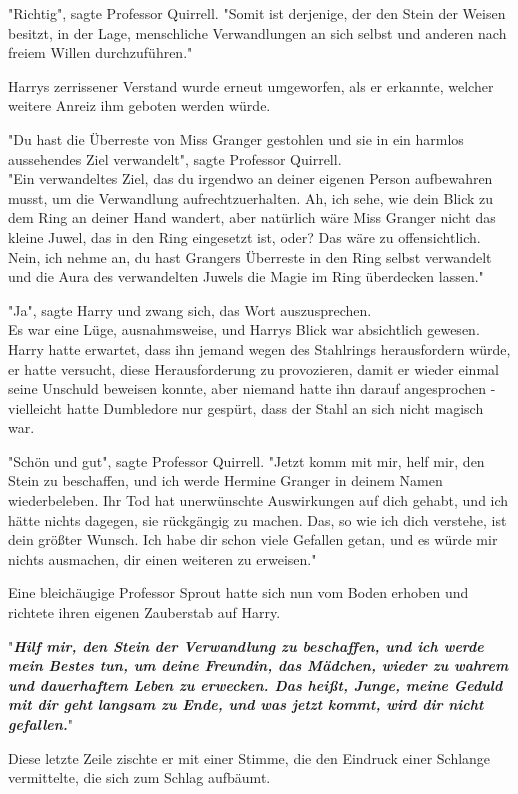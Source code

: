 {"Richtig", sagte Professor Quirrell. "Somit ist derjenige, der den Stein der Weisen besitzt, in der Lage, menschliche Verwandlungen an sich selbst und anderen nach freiem Willen durchzuführen."

Harrys zerrissener Verstand wurde erneut umgeworfen, als er erkannte, welcher weitere Anreiz ihm geboten werden würde.

"Du hast die Überreste von Miss Granger gestohlen und sie in ein harmlos aussehendes Ziel verwandelt", sagte Professor Quirrell.\\ "Ein verwandeltes Ziel, das du irgendwo an deiner eigenen Person aufbewahren musst, um die Verwandlung aufrechtzuerhalten. Ah, ich sehe, wie dein Blick zu dem Ring an deiner Hand wandert, aber natürlich wäre Miss Granger nicht das kleine Juwel, das in den Ring eingesetzt ist, oder? Das wäre zu offensichtlich. Nein, ich nehme an, du hast Grangers Überreste in den Ring selbst verwandelt und die Aura des verwandelten Juwels die Magie im Ring überdecken lassen."

"Ja", sagte Harry und zwang sich, das Wort auszusprechen.\\ Es war eine Lüge, ausnahmsweise, und Harrys Blick war absichtlich gewesen. Harry hatte erwartet, dass ihn jemand wegen des Stahlrings herausfordern würde, er hatte versucht, diese Herausforderung zu provozieren, damit er wieder einmal seine Unschuld beweisen konnte, aber niemand hatte ihn darauf angesprochen - vielleicht hatte Dumbledore nur gespürt, dass der Stahl an sich nicht magisch war.

"Schön und gut", sagte Professor Quirrell. "Jetzt komm mit mir, helf mir, den Stein zu beschaffen, und ich werde Hermine Granger in deinem Namen wiederbeleben. Ihr Tod hat unerwünschte Auswirkungen auf dich gehabt, und ich hätte nichts dagegen, sie rückgängig zu machen. Das, so wie ich dich verstehe, ist dein größter Wunsch. Ich habe dir schon viele Gefallen getan, und es würde mir nichts ausmachen, dir einen weiteren zu erweisen."

Eine bleichäugige Professor Sprout hatte sich nun vom Boden erhoben und richtete ihren eigenen Zauberstab auf Harry.

"\textbf{\emph{Hilf mir, den Stein der Verwandlung zu beschaffen, und ich werde mein Bestes tun, um deine Freundin, das Mädchen, wieder zu wahrem und dauerhaftem Leben zu erwecken. Das heißt, Junge, meine Geduld mit dir geht langsam zu Ende, und was jetzt kommt, wird dir nicht gefallen.}}"

Diese letzte Zeile zischte er mit einer Stimme, die den Eindruck einer Schlange vermittelte, die sich zum Schlag aufbäumt.

}
